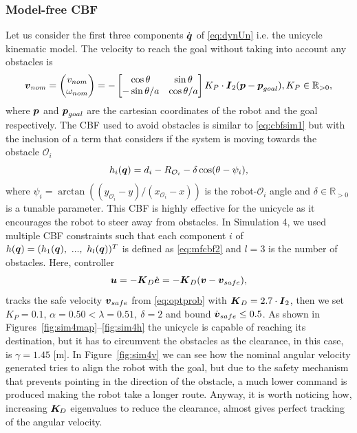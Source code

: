 \subsubsection{Model-free CBF}
Let us consider  the first three components $\dot{\boldsymbol{q}}$ of \eqref{eq:dynUn} i.e. the unicycle kinematic model. The velocity to reach the goal without taking into account any obstacles is
\begin{equation}\label{eq:qnominalu}
    \boldsymbol{v}_{nom}= \begin{pmatrix}v_{nom} \\ \omega_{nom} \end{pmatrix} = -\begin{bmatrix}\cos\theta & \sin \theta\\ -\sin \theta /a & \cos \theta/a \end{bmatrix} K_P\cdot\boldsymbol{I}_{2} (\boldsymbol{p}-\boldsymbol{p}_{goal}), K_P \in \mathbb{R}_{>0},
\end{equation}
where $\boldsymbol{p}$ and $\boldsymbol{p}_{goal}$ are the cartesian coordinates of the robot and the goal respectively.
The CBF used to avoid obstacles is similar to \eqref{eq:cbfsim1} but with the inclusion of a term that considers if the system is moving towards the obstacle $\mathcal{O}_i$
\begin{equation}\label{eq:mfcbf2}
    h_i({\boldsymbol{q}}) = d_i-R_{\mathcal{O}_i}-\delta \cos(\theta - \psi_i),
\end{equation}
where $\psi_i= \arctan((y_{\mathcal{O}_i}-y)/(x_{\mathcal{O}_i}-x))$ is the robot-$\mathcal{O}_i$ angle and $\delta \in \mathbb{R}_{>0}$ is a tunable parameter. This CBF is highly effective for the unicycle as it encourages the robot to steer away from obstacles. In Simulation 4, we used multiple CBF constraints such that each component $i$ of $h({\boldsymbol{q}}) = (h_1({\boldsymbol{q}}),~...,~h_{l}({\boldsymbol{q}}))^T$ is defined as \eqref{eq:mfcbf2} and $l=3$ is the number of obstacles. 
Here, controller 
\begin{equation}
    \boldsymbol{u} = -\boldsymbol{K}_D \dot{\boldsymbol{e}} =  -\boldsymbol{K}_D(\boldsymbol{v}-\boldsymbol{v}_{safe}),
\end{equation}
tracks the safe velocity $\boldsymbol{v}_{safe}$ from \eqref{eq:optprob} with $\boldsymbol{K}_D=2.7\cdot\boldsymbol{I}_{2}$, then we set $K_P=0.1$, $\alpha = 0.50<\lambda=0.51,~\delta=2$ and bound $\dot{\boldsymbol{v}}_{safe} \leq 0.5$. As shown in Figures~\ref{fig:sim4map}--\ref{fig:sim4h} the unicycle is capable of reaching its destination, but it has to circumvent the obstacles as the clearance, in this case, is $\gamma=1.45$ [m]. In Figure~\ref{fig:sim4v} we can see how the nominal angular velocity generated tries to align the robot with the goal, but due to the safety mechanism that prevents pointing in the direction of the obstacle, a much lower command is produced making the robot take a longer route. Anyway, it is worth noticing how, increasing $\boldsymbol{K}_{\!D}$ eigenvalues to reduce the clearance, almost gives perfect tracking of the angular velocity.
